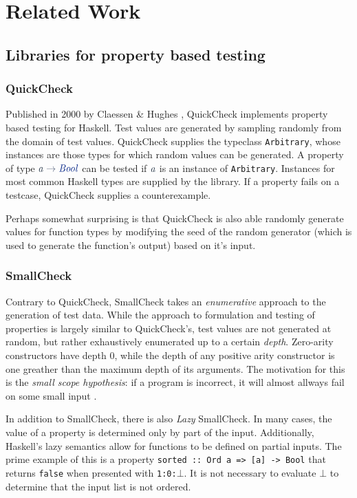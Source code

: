 \documentclass[a4paper,msc,twosized=semi]{uustthesis}
\newcommand*{\mathcolor}{}
\def\mathcolor#1#{\mathcoloraux{#1}}
\newcommand*{\mathcoloraux}[3]{%
  \protect\leavevmode
  \begingroup
    \color#1{#2}#3%
  \endgroup
}
\newcommand{\HSSym}[1]{\mathcolor{hsblue4}{#1}}
\newcommand{\HSCon}[1]{\mathcolor{hsblue3}{\mathit{#1}}}
\newcommand{\HSVar}[1]{\mathcolor{hsblue5}{\mathit{#1}}}
\begin{document}
\section{Related Work}

\subsection{Libraries for property based testing}

\subsubsection{QuickCheck}

  Published in 2000 by Claessen \& Hughes \cite{claessen2011quickcheck}, QuickCheck implements property based testing for Haskell. Test values are generated by sampling randomly from the domain of test values. QuickCheck supplies the typeclass \texttt{Arbitrary}, whose instances are those types for which random values can be generated. A property of type \ensuremath{\HSVar{a}\HSSym{\to} \HSCon{Bool}} can be tested if \ensuremath{\HSVar{a}} is an instance of \texttt{Arbitrary}. Instances for most common Haskell types are supplied by the library. If a property fails on a testcase, QuickCheck supplies a counterexample. 

  Perhaps somewhat surprising is that QuickCheck is also able randomly generate values for function types by modifying the seed of the random generator (which is used to generate the function's output) based on it's input. 

\subsubsection{SmallCheck} 

  Contrary to QuickCheck, SmallCheck \cite{runciman2008smallcheck} takes an \textit
  {enumerative} approach to the generation of test data. While the approach to 
  formulation and testing of properties is largely similar to QuickCheck's, test 
  values are not generated at random, but rather exhaustively enumerated up to a 
  certain \textit{depth}. Zero-arity constructors have depth $0$, while the depth of 
  any positive arity constructor is one greather than the maximum depth of its 
  arguments. The motivation for this is the \textit{small scope hypothesis}: if a 
  program is incorrect, it will almost allways fail on some small input \cite
  {andoni2003evaluating}. 

  In addition to SmallCheck, there is also \textit{Lazy} SmallCheck. In many cases, 
  the value of a property is determined only by part of the input. Additionally, 
  Haskell's lazy semantics allow for functions to be defined on partial inputs. The 
  prime example of this is a property \texttt{sorted :: Ord a => [a] -> Bool} that 
  returns \texttt{false} when presented with \texttt{1:0:$\bot$}. It is not necessary 
  to evaluate $\bot$ to determine that the input list is not ordered. 
\end{document}
